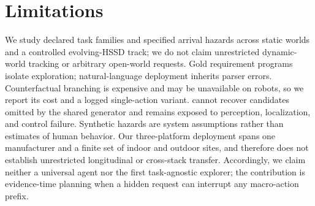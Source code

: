 \section{Limitations}
\label{sec:limitations}

We study declared task families and specified arrival hazards across static worlds and a controlled evolving-HSSD track; we do not claim unrestricted dynamic-world tracking or arbitrary open-world requests.
Gold requirement programs isolate exploration; natural-language deployment inherits parser errors.
Counterfactual branching is expensive and may be unavailable on robots, so we report its cost and a logged single-action variant.
\method{} cannot recover candidates omitted by the shared generator and remains exposed to perception, localization, and control failure.
Synthetic hazards are system assumptions rather than estimates of human behavior.
Our three-platform deployment spans one manufacturer and a finite set of indoor and outdoor sites, and therefore does not establish unrestricted longitudinal or cross-stack transfer.
Accordingly, we claim neither a universal agent nor the first task-agnostic explorer; the contribution is evidence-time planning when a hidden request can interrupt any macro-action prefix.
